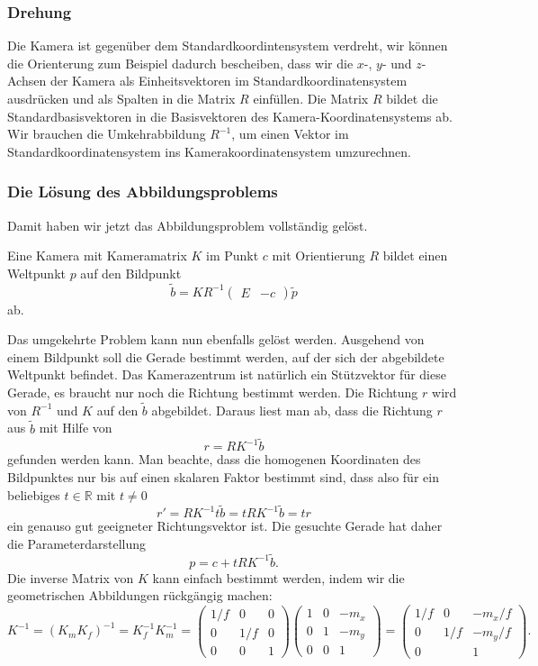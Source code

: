 \subsubsection{Drehung}
Die Kamera ist gegenüber dem Standardkoordintensystem verdreht,
wir können die Orienterung zum Beispiel dadurch bescheiben, dass wir
die $x$-, $y$- und $z$-Achsen der Kamera als Einheitsvektoren im
Standardkoordinatensystem ausdrücken und als Spalten in die Matrix $R$
einfüllen.
Die Matrix $R$ bildet die Standardbasisvektoren in die Basisvektoren
des Kamera-Koordinatensystems ab.
Wir brauchen die Umkehrabbildung $R^{-1}$, um einen Vektor im
Standardkoordinatensystem ins Kamerakoordinatensystem umzurechnen.

\subsubsection{Die Lösung des Abbildungsproblems}
Damit haben wir jetzt das Abbildungsproblem vollständig gelöst.

\begin{satz}
Eine Kamera mit Kameramatrix $K$ im Punkt $c$ mit Orientierung $R$ bildet
einen Weltpunkt $p$ auf den Bildpunkt
\[
\tilde b
=
K R^{-1} \begin{pmatrix} E&-c\end{pmatrix} \tilde p
\]
ab.
\end{satz}

Das umgekehrte Problem kann nun ebenfalls gelöst werden.
Ausgehend von einem Bildpunkt soll die Gerade bestimmt werden, auf der
sich der abgebildete Weltpunkt befindet.
Das Kamerazentrum ist natürlich ein Stützvektor für diese Gerade, es
braucht nur noch die Richtung bestimmt werden.
Die Richtung $r$ wird von $R^{-1}$ und $K$ auf den $\tilde b$ abgebildet.
Daraus liest man ab, dass die Richtung $r$ aus $\tilde b$
mit Hilfe von
\[
r = RK^{-1} \tilde b
\]
gefunden werden kann.
Man beachte, dass die homogenen Koordinaten des Bildpunktes nur bis auf
einen skalaren Faktor bestimmt sind, dass also für ein beliebiges
$t\in\mathbb R$ mit $t\ne 0$ 
\[
r' = RK^{-1} t\tilde b = t RK^{-1} \tilde b=tr
\]
ein genauso gut geeigneter Richtungsvektor ist.
Die gesuchte Gerade hat daher die Parameterdarstellung
\[
p = c + t RK^{-1}\tilde b.
\]
Die inverse Matrix von $K$ kann einfach bestimmt werden, indem wir die
geometrischen Abbildungen rückgängig machen:
\[
K^{-1}
=
(K_mK_f)^{-1}
=
K_f^{-1}K_m^{-1}
=
\begin{pmatrix}
1/f& 0 & 0\\
0  &1/f& 0\\
0  & 0 & 1
\end{pmatrix}
\begin{pmatrix}
1&0&-m_x\\
0&1&-m_y\\
0&0&1
\end{pmatrix}
=
\begin{pmatrix}
1/f& 0 & -m_x/f\\
 0 &1/f& -m_y/f\\
 0 &   &  1
\end{pmatrix}.
\]




